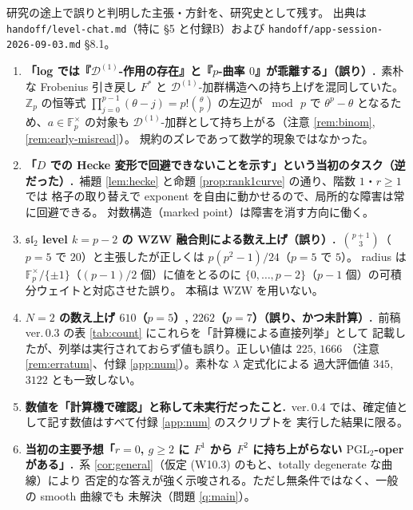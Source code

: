\documentclass[a4paper,11pt]{ltjsarticle}
\theoremstyle{plain}
\theoremstyle{definition}
\newcommand{\bbZ}{\mathbb{Z}}
\newcommand{\bbF}{\mathbb{F}}
\newcommand{\cD}{\mathcal{D}}
\begin{document}
研究の途上で誤りと判明した主張・方針を、研究史として残す。
出典は \texttt{handoff/level-chat.md}（特に \S5 と付録B）および
\texttt{handoff/app-session-2026-09-03.md} \S8.1。

\begin{enumerate}[leftmargin=1.8em]
\item \textbf{「log では『$\cD^{(1)}$-作用の存在』と『$p$-曲率 $0$』が乖離する」（誤り）.}\
      素朴な Frobenius 引き戻し $F^*$ と $\cD^{(1)}$-加群構造への持ち上げを混同していた。
      $\bbZ_p$ の恒等式 $\prod_{j=0}^{p-1}(\theta-j)=p!\binom{\theta}{p}$ の左辺が
      $\bmod\,p$ で $\theta^p-\theta$ となるため、$a\in\bbF_p^\times$ の対象も
      $\cD^{(1)}$-加群として持ち上がる（注意 \ref{rem:binom}, \ref{rem:early-misread}）。
      規約のズレであって数学的現象ではなかった。
\item \textbf{「$D$ での Hecke 変形で回避できないことを示す」という当初のタスク（逆だった）.}\
      補題 \ref{lem:hecke} と命題 \ref{prop:rank1curve} の通り、階数 $1$・$r\ge1$ では
      格子の取り替えで exponent を自由に動かせるので、局所的な障害は常に回避できる。
      対数構造（marked point）は障害を消す方向に働く。
\item \textbf{$\mathfrak{sl}_2$ level $k=p-2$ の WZW 融合則による数え上げ（誤り）.}\
      $\binom{p+1}{3}$（$p=5$ で $20$）と主張したが正しくは $p(p^2-1)/24$（$p=5$ で $5$）。
      radius は $\bbF_p^\times/\{\pm1\}$（$(p-1)/2$ 個）に値をとるのに
      $\{0,\dots,p-2\}$（$p-1$ 個）の可積分ウェイトと対応させた誤り。
      本稿は WZW を用いない。
\item \textbf{$N=2$ の数え上げ $610$（$p=5$）, $2262$（$p=7$）（誤り、かつ未計算）.}\
      前稿 ver.\,0.3 の表 \ref{tab:count} にこれらを「計算機による直接列挙」として
      記載したが、列挙は実行されておらず値も誤り。正しい値は $225$, $1666$
      （注意 \ref{rem:erratum}、付録 \ref{app:num}）。素朴な $\lambda$ 定式化による
      過大評価値 $345$, $3122$ とも一致しない。
\item \textbf{数値を「計算機で確認」と称して未実行だったこと.}\
      ver.\,0.4 では、確定値として記す数値はすべて付録 \ref{app:num} のスクリプトを
      実行した結果に限る。
\item \textbf{当初の主要予想「$r=0$, $g\ge2$ に $F^1$ から $F^2$ に持ち上がらない
      $\mathrm{PGL}_2$-oper がある」.}\
      系 \ref{cor:general}（仮定 (W10.3) のもと、totally degenerate な曲線）により
      否定的な答えが強く示唆される。ただし無条件ではなく、一般の smooth 曲線でも
      未解決（問題 \ref{q:main}）。
\end{enumerate}
\end{document}
